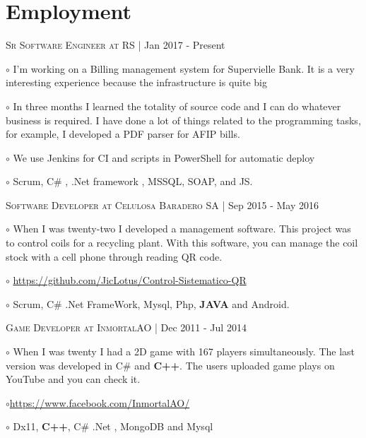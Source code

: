 \documentclass[letterpaper]{article}
\renewenvironment{itemize}{
  \begin{list}{}{
    \setlength{\leftmargin}{1.5em}
  }
}{
  \end{list}
}
\newenvironment{no-indent-itemize}{
  \begin{list}{}{
    \setlength{\leftmargin}{0em}
  }
}{
  \end{list}
}
\def\bullet{$\circ$\xspace}
\begin{document}
\section*{Employment}
\begin{no-indent-itemize}

    \item\textsc{Sr Software Engineer at RS} | Jan 2017 - Present
    \begin{itemize}
    \item\bullet I'm working on a Billing management system for Supervielle Bank. It is a very interesting experience because the infrastructure is quite big
    \item\bullet In three months I learned the totality of source code and I can do whatever business is required. I have done a lot of things related to the programming tasks, for example, I developed a PDF parser for AFIP bills.
    \item\bullet We use Jenkins for CI and scripts in PowerShell for automatic deploy
    \item\bullet  Scrum, C\# , .Net framework , MSSQL, SOAP, and JS.
    \end{itemize}


    \item \textsc{Software Developer at Celulosa Baradero SA} | Sep 2015 - May 2016
    \begin{itemize}
    \item\bullet  When I was twenty-two I developed a management software. This project was to control coils for a recycling plant. With this software, you can manage the coil stock with a cell phone through reading QR code.
    \item\bullet
    \href{https://github.com/JicLotus/Control-Sistematico-QR}{https://github.com/JicLotus/Control-Sistematico-QR}
    \item\bullet Scrum, C\# .Net FrameWork, Mysql, Php, \textbf{JAVA} and Android.
    \end{itemize}
    
    
    \item\textsc{Game Developer at InmortalAO} | Dec 2011 - Jul 2014
    \begin{itemize} 
    \item\bullet
    When I was twenty I had a 2D game with 167 players simultaneously. The last version was developed in C\# and \textbf{C++}. The users uploaded game plays on YouTube and you can check it.
    \item\bullet \href{https://www.facebook.com/InmortalAO/}{https://www.facebook.com/InmortalAO/}
    \item\bullet Dx11, \textbf{C++}, C\# .Net , MongoDB and Mysql
    \end{itemize}
    

\end{no-indent-itemize}
\end{document}
